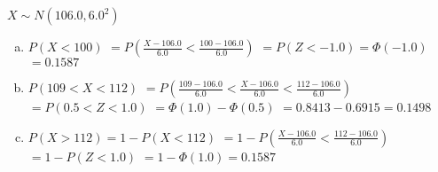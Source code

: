 \documentclass{article}%
\begin{document}
%
\normalsize%
\Large $ X \sim N(106.0, 6.0^2) $%
\begin{enumerate}[a)]%
\item $P(X < 100)$%
$=P\left(\frac{X-106.0}{6.0} < \frac{100-106.0}{6.0}\right)$%
$=P\left(Z < -1.0 \right)=\Phi\left( -1.0 \right)$%
$= 0.1587 $%
\Large \item $P(109 < X < 112)$%
$=P\left(\frac{109-106.0}{6.0} < \frac{X-106.0}{6.0} < \frac{112-106.0}{6.0}\right)$%
$=P\left(0.5 < Z < 1.0 \right)$%
$=\Phi\left( 1.0 \right) - \Phi\left( 0.5 \right)$%
$=0.8413 - 0.6915 = 0.1498 $%
\item $P(X > 112) = 1 - P(X < 112)$%
$=1-P\left(\frac{X-106.0}{6.0} < \frac{112-106.0}{6.0}\right)$%
$=1-P\left(Z < 1.0 \right)$%
$=1 - \Phi\left( 1.0 \right) =  0.1587 $%
\end{enumerate}%
\end{document}
